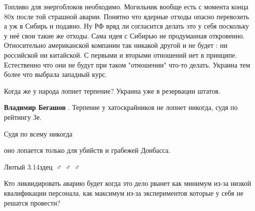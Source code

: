 \begin{itemize}
\obeycr
Топливо для энергоблоков необходимо.
Могильник вообще есть с момента конца 80х после той страшной аварии.
Понятно что ядерные отходы опасно перевозить а уж в Сибирь и подавно.
Ну РФ вряд ли согласится делать это у себя поскольку у неё свои такие же отходы.
Сама идея с Сибирью не продуманная откровенно.
Относительно американской компании так никакой другой и не будет : ни российской ни китайской.
С первыми и вторыми отношений нет в принципе.
Естественно что они не будут при таком "отношении" что-то делать.
Украина тем более что выбрала западный курс.
\restorecr

 
Когда же у народа лопнет терпение? Украина уже в резервации штатов.

\begin{itemize}
 
\textbf{Владимир Бегашов} . Терпение у хатоскрайников не лопнет никогда, судя по рейтингу Зе.

 
Судя по всему никогда

 
оно лопается только для убийств и грабежей Донбасса.
\end{itemize}

 
Лютый 3.14здец🤦🏻♂️🤦🏻♂️🤦🏻♂️


Кто ликвидировать аварию будет когда это дело рванет как минимум из-за низкой
квалификации персонала, как максимум из-за экспериментов которые у себя не
решатся провести?


\end{itemize}
